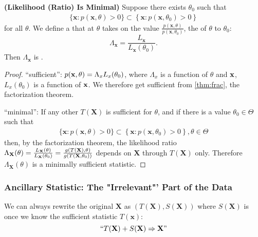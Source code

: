 \documentclass{article}
\newcommand{\bfs}[1]{\textbf{({#1}) }}
\begin{document}
\begin{lema}\bfs{Likelihood (Ratio) Is Minimal}\label{eq:likeratio}
Suppose there exists $\theta_{0}$ such that
\begin{align*}
\{\mathbf{x}: p(\mathbf{x}, \theta)>0\} \subset\left\{\mathbf{x}: p\left(\mathbf{x}, \theta_{0}\right)>0\right\}
\end{align*}
for all $\theta$. We define a  that at $\theta$ takes on the value $\frac{p(\mathbf{x}, \theta)}{p\left(\mathbf{x}, \theta_{0}\right)}$, the  of $\theta$ to $\theta_{0}$:
 $$\Lambda_{\mathbf{x}}=\frac{L_{\mathbf{x}}}{L_{\mathbf{x}}\left(\theta_{0}\right)}.$$
Then $\Lambda_{\mathbf{x}}$ is .
\end{lema}
\begin{proof}
``sufficient'': 
$p(\mathbf{x},\theta) = \Lambda_x L_{x}(\theta_0)$, where $\Lambda_x$ is a function of $\theta$ and $\mathbf{x}$, $ L_{x}(\theta_0)$ is a function of $\mathbf{x}$. We therefore get sufficient from  \cref{thm:frac}, the factorization theorem.

``minimal'':
If any other $T(\mathbf{X})$ is sufficient for $\theta$, and if there is a value $\theta_{0} \in \Theta$ such that
\begin{align*}
\{\mathbf{x}: p(\mathbf{x}, \theta)>0\} \subset\left\{\mathbf{x}: p\left(\mathbf{x}, \theta_{0}\right)>0\right\}, \theta \in \Theta
\end{align*}
then, by the factorization theorem, the likelihood ratio
$\Lambda_{\mathbf{X}}(\theta)=\frac{L_{\mathbf{X}}(\theta)}{L_{\mathbf{X}}\left(\theta_{0}\right)}=\frac{g(T(\mathbf{X}),\theta)}{g(T(\mathbf{X},\theta_0))}$
depends on $\mathbf{X}$ through $T(\mathbf{X})$ only. Therefore $\Lambda_{\mathbf{X}}(\theta)$ is a minimally sufficient statistic.
\end{proof}


\subsubsection{Ancillary Statistic: The "Irrelevant"' Part of the Data}
We can always rewrite the original $\mathbf{X}$ as $(T(\mathbf{X}), S(\mathbf{X}))$ where $S(\mathbf{X})$ is  once we know the sufficient statistic $T(\mathbf{x})$:
$$``T(\mathbf{X}) + S(\mathbf{X}) \Rightarrow \mathbf{X}"$$
\end{document}
